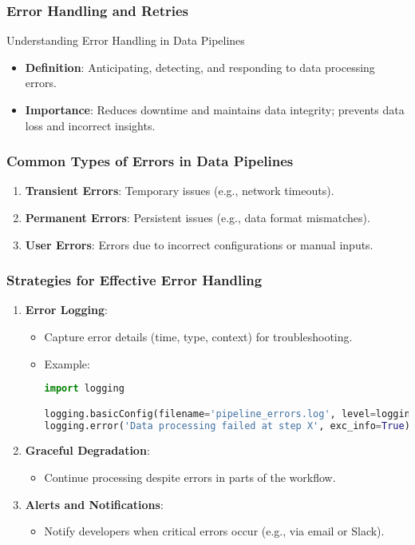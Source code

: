 \documentclass[aspectratio=169]{beamer}
\begin{document}
\begin{frame}[fragile]
    \frametitle{Error Handling and Retries}
    \begin{block}{Understanding Error Handling in Data Pipelines}
        \begin{itemize}
            \item \textbf{Definition}: Anticipating, detecting, and responding to data processing errors.
            \item \textbf{Importance}: Reduces downtime and maintains data integrity; prevents data loss and incorrect insights.
        \end{itemize}
    \end{block}
\end{frame}

\begin{frame}[fragile]
    \frametitle{Common Types of Errors in Data Pipelines}
    \begin{enumerate}
        \item \textbf{Transient Errors}: Temporary issues (e.g., network timeouts).
        \item \textbf{Permanent Errors}: Persistent issues (e.g., data format mismatches).
        \item \textbf{User Errors}: Errors due to incorrect configurations or manual inputs.
    \end{enumerate}
\end{frame}

\begin{frame}[fragile]
    \frametitle{Strategies for Effective Error Handling}
    \begin{enumerate}
        \item \textbf{Error Logging}:
            \begin{itemize}
                \item Capture error details (time, type, context) for troubleshooting.
                \item Example:
                \begin{lstlisting}[language=Python]
import logging

logging.basicConfig(filename='pipeline_errors.log', level=logging.ERROR)
logging.error('Data processing failed at step X', exc_info=True)
                \end{lstlisting}
            \end{itemize}
        \item \textbf{Graceful Degradation}:
            \begin{itemize}
                \item Continue processing despite errors in parts of the workflow. 
            \end{itemize}
        \item \textbf{Alerts and Notifications}:
            \begin{itemize}
                \item Notify developers when critical errors occur (e.g., via email or Slack).
            \end{itemize}
    \end{enumerate}
\end{frame}
\end{document}
